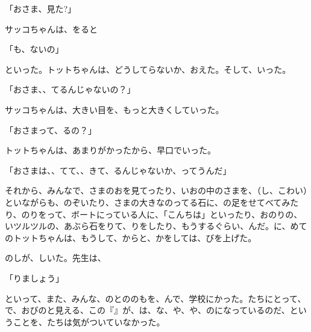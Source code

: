 「おさま、見た?」

サッコちゃんは、をると

「も、ないの」

といった。トットちゃんは、どうしてらないか、おえた。そして、いった。

「おさま、、てるんじゃないの？」

サッコちゃんは、大きい目を、もっと大きくしていった。

「おさまって、るの？」

トットちゃんは、あまりがかったから、早口でいった。

「おさまは、、てて、、きて、るんじゃないか、ってうんだ」

それから、みんなで、さまのおを見てったり、いおの中のさまを、（し、こわい）といながらも、のぞいたり、さまの大きなのってる石に、の足をせてべてみたり、のりをって、ボートにっている人に、「こんちは」といったり、おのりの、いツルツルの、あぶら石をりて、りをしたり、もうするぐらい、んだ。に、めてのトットちゃんは、もうして、からと、かをしては、びを上げた。

のしが、しいた。先生は、

「りましょう」

といって、また、みんな、のとののもを、んで、学校にかった。たちにとって、で、おびのと見える、この『』が、は、な、や、や、のになっているのだ、ということを、たちは気がついていなかった。

